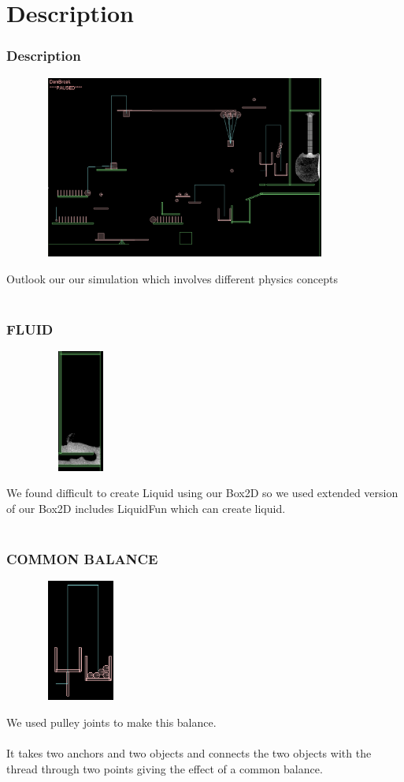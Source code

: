 \documentclass[t,compress,11pt,xcolor=dvipsnames]{beamer}
\begin{document}
\section{Description}
\frametitle{Description}
\begin{frame}
\begin{center}
\includegraphics[width=12cm,height=6cm]{Selection_002}
\end{center}
Outlook our our simulation which involves different physics concepts\\~\\
\end{frame}
\begin{frame}
\frametitle{FLUID}
\begin{center}
\includegraphics[width=5cm,height=4cm]{liquid}
\end{center}
We found difficult to create Liquid using our Box2D so we used extended version of our Box2D  includes LiquidFun which can create liquid.\\~\\
\end{frame}
\begin{frame}
\frametitle{COMMON BALANCE}
\begin{center}
\includegraphics[width=5cm,height=4cm]{balancing}
\end{center}
We used pulley joints to make this balance.\\~\\
It takes two anchors and two objects and connects the two objects with
the thread through two points giving the effect of a common balance.\\~\\
\end{frame}
\end{document}
